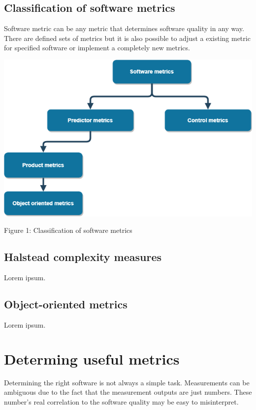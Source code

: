 \section{Classification of software metrics}

Software metric can be any metric that determines software quality in any way. There are defined sets of metrics but it is also possible to adjust a existing metric for specified software or implement a completely new metrics.

\begin{center}
\includegraphics[scale=0.5]{metrictree.png}

Figure 1: Classification of software metrics
\end{center}

\section{Halstead complexity measures}

Lorem ipsum.

\section{Object-oriented metrics}

Lorem ipsum.

\chapter{Determing useful metrics}

Determining the right software is not always a simple task. Measurements can be ambiguous due to the fact that the measurement outputs are just numbers. These number's real correlation to the software quality may be easy to misinterpret.

